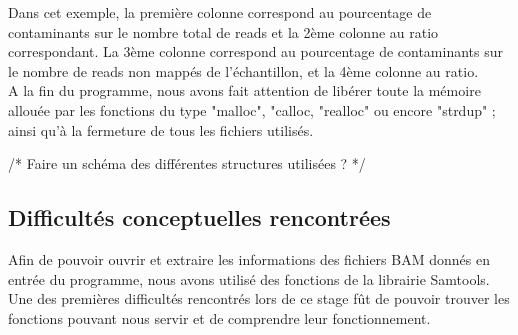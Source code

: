 \documentclass[a4paper,12pt]{article}
\begin{document}
Dans cet exemple, la première colonne correspond au pourcentage de contaminants sur le nombre total de reads et la 2ème colonne au ratio correspondant. La 3ème colonne correspond au pourcentage de contaminants sur le nombre de reads non mappés de l'échantillon, et la 4ème colonne au ratio. \\

A la fin du programme, nous avons fait attention de libérer toute la mémoire allouée par les fonctions du type "malloc", "calloc, "realloc" ou encore "strdup" ; ainsi qu'à la fermeture de tous les fichiers utilisés.

/* Faire un schéma des différentes structures utilisées ? */ 

\subsection{Difficultés conceptuelles rencontrées}

Afin de pouvoir ouvrir et extraire les informations des fichiers BAM donnés en entrée du programme, nous avons utilisé des fonctions de la librairie Samtools. Une des premières difficultés rencontrés lors de ce stage fût de pouvoir trouver les fonctions pouvant nous servir et de comprendre leur fonctionnement. \\
\end{document}
